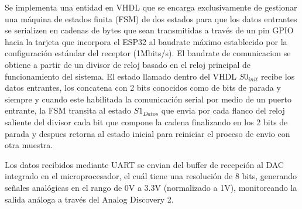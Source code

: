         Se implementa una entidad en VHDL que se encarga exclusivamente de gestionar una máquina de estados finita (FSM) de dos estados para que los datos entrantes se serializen en cadenas de bytes que sean transmitidas a través de un pin GPIO hacia la tarjeta que incorpora el ESP32 al baudrate máximo establecido por la configuración estándar del receptor (1Mbits/s). El baudrate de comunicacion se obtiene a partir de un divisor de reloj basado en el reloj principal de funcionamiento del sistema. El estado llamado dentro del VHDL $S0_{init}$ recibe los datos entrantes, los concatena con 2 bits conocidos como de bits de parada y siempre y cuando este habilitada la comunicación serial por medio de un puerto entrante, la FSM transita al estado $S1_{Datos}$ que envia por cada flanco del reloj saliente del divisor cada bit que compone la cadena finalizando en los 2 bits de parada y despues retorna al estado inicial para reiniciar el proceso de envio con otra muestra.
        
        Los datos recibidos mediante UART se envian del buffer de recepción al DAC integrado en el microprocesador, el cuál tiene una resolución de 8 bits, generando señales analógicas en el rango de 0V a 3.3V (normalizado a 1V), monitoreando la salida análoga a través del Analog Discovery 2.        

    





